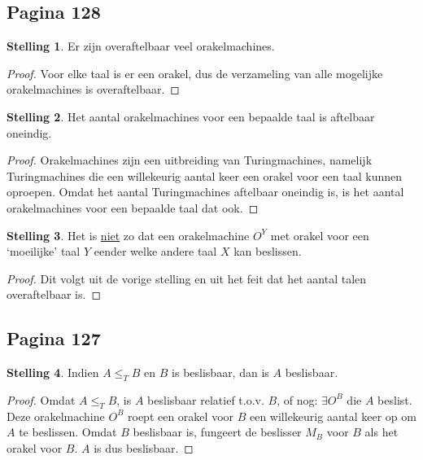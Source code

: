 \documentclass[kulak]{kulakarticle}
\theoremstyle{definition}
\newtheorem*{stelling}{Stelling}
\begin{document}
	\subsection*{Pagina 128}

	\begin{stelling}
		Er zijn overaftelbaar veel orakelmachines.
	\end{stelling}

	\begin{proof}
		Voor elke taal is er een orakel, dus de verzameling van alle mogelijke orakelmachines is overaftelbaar.
	\end{proof}

	\begin{stelling}
		Het aantal orakelmachines voor een bepaalde taal is aftelbaar oneindig.
	\end{stelling}

	\begin{proof}
		Orakelmachines zijn een uitbreiding van Turingmachines, namelijk Turingmachines die een willekeurig aantal keer een orakel voor een taal kunnen oproepen. Omdat het aantal Turingmachines aftelbaar oneindig is, is het aantal orakelmachines voor een bepaalde taal dat ook.
	\end{proof}

	\begin{stelling}
		Het is \underline{niet} zo dat een orakelmachine \(O^Y\) met orakel voor een `moeilijke' taal \(Y\) eender welke andere taal \(X\) kan beslissen.
	\end{stelling}

	\begin{proof}
		Dit volgt uit de vorige stelling en uit het feit dat het aantal talen overaftelbaar is.
	\end{proof}

	\subsection*{Pagina 127}

	\begin{stelling}
		Indien \( A \leq_T B \) en \( B \) is beslisbaar, dan is \( A \) beslisbaar.
	\end{stelling}

	\begin{proof}
		Omdat \( A \leq_T B \), is \(A\) beslisbaar relatief t.o.v. \(B\), of nog: \(\exists O^B\) die \(A\) beslist. Deze orakelmachine \( O^B \) roept een orakel  voor \(B\) een willekeurig aantal keer op om \(A\) te beslissen. Omdat \(B\) beslisbaar is, fungeert de beslisser \(M_B\) voor \(B\) als het orakel voor \(B\). \(A\) is dus beslisbaar.
	\end{proof}
\end{document}

